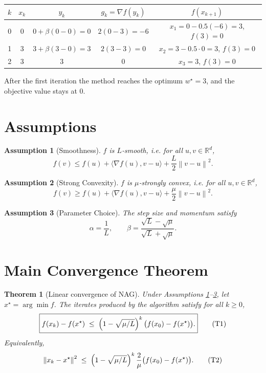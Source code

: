 \documentclass{article}
\newtheorem{theorem}{Theorem}
\newtheorem{assumption}{Assumption}
\newcommand{\norm}[1]{\left\|#1\right\|}
\newcommand{\ip}[2]{\langle #1,#2\rangle}
\begin{document}
\begin{center}
\begin{tabular}{c|c|c|c|c}
$k$ & $x_k$ & $y_k$ & $g_k=\nabla f(y_k)$ & $f(x_{k+1})$ \\ \hline
0 & $0$ & $0+\beta(0-0)=0$ & $2(0-3)=-6$ & $x_1=0-0.5(-6)=3$, $f(3)=0$ \\ \hline
1 & $3$ & $3+\beta(3-0)=3$ & $2(3-3)=0$ & $x_2=3-0.5\cdot0=3$, $f(3)=0$ \\ \hline
2 & $3$ & $3$ & $0$ & $x_3=3$, $f(3)=0$
\end{tabular}
\end{center}
After the first iteration the method reaches the optimum $w^\star=3$, and the objective value stays at $0$.

\section*{Assumptions}
\begin{assumption}[Smoothness]\label{ass:smooth}
$f$ is $L$‑smooth, i.e. for all $u,v\in\mathbb{R}^d$,
\[
f(v)\le f(u)+\ip{\nabla f(u)}{v-u}+\frac{L}{2}\norm{v-u}^2 .
\tag{A1}
\]
\end{assumption}
\begin{assumption}[Strong Convexity]\label{ass:strong}
$f$ is $\mu$‑strongly convex, i.e. for all $u,v\in\mathbb{R}^d$,
\[
f(v)\ge f(u)+\ip{\nabla f(u)}{v-u}+\frac{\mu}{2}\norm{v-u}^2 .
\tag{A2}
\]
\end{assumption}
\begin{assumption}[Parameter Choice]\label{ass:param}
The step size and momentum satisfy
\[
\alpha=\frac{1}{L},\qquad 
\beta=\frac{\sqrt{L}-\sqrt{\mu}}{\sqrt{L}+\sqrt{\mu}} .
\tag{A3}
\]
\end{assumption}

\section*{Main Convergence Theorem}
\begin{theorem}[Linear convergence of NAG]\label{thm:linear}
Under Assumptions \ref{ass:smooth}–\ref{ass:param}, let $x^\star=\arg\min f$. The iterates produced by the algorithm satisfy for all $k\ge 0$,
\[
\boxed{
f(x_k)-f(x^\star)\;\le\;\Bigl(1-\sqrt{\mu/L}\Bigr)^{k}\,\bigl(f(x_0)-f(x^\star)\bigr) .
}
\tag{T1}
\]
Equivalently,
\[
\norm{x_k-x^\star}^2 \;\le\; \Bigl(1-\sqrt{\mu/L}\Bigr)^{k}\,\frac{2}{\mu}\bigl(f(x_0)-f(x^\star)\bigr) .
\tag{T2}
\]
\end{theorem}
\end{document}
